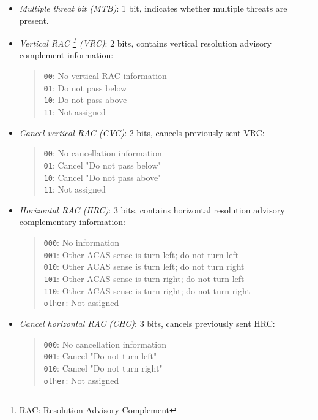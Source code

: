 \begin{itemize}
  \item \emph{Multiple threat bit (MTB)}: 1 bit, indicates whether multiple threats are present.

  \item \emph{Vertical RAC \footnote{RAC: Resolution Advisory Complement} (VRC)}: 2 bits, contains vertical resolution advisory complement information:
  \begin{quote}
    \small
    \texttt{00}: No vertical RAC information \\
    \texttt{01}: Do not pass below \\
    \texttt{10}: Do not pass above \\
    \texttt{11}: Not assigned
  \end{quote}

  \item \emph{Cancel vertical RAC (CVC)}: 2 bits, cancels previously sent VRC:
  \begin{quote}
    \small
    \texttt{00}: No cancellation information \\
    \texttt{01}: Cancel "Do not pass below" \\
    \texttt{10}: Cancel "Do not pass above" \\
    \texttt{11}: Not assigned
  \end{quote}

  \item \emph{Horizontal RAC (HRC)}: 3 bits, contains horizontal resolution advisory complementary information:
  \begin{quote}
    \small
    \texttt{000}: No information\\
    \texttt{001}: Other ACAS sense is turn left; do not turn left \\
    \texttt{010}: Other ACAS sense is turn left; do not turn right \\
    \texttt{101}: Other ACAS sense is turn right; do not turn left \\
    \texttt{110}: Other ACAS sense is turn right; do not turn right \\
    \texttt{other}: Not assigned
  \end{quote}

  \item \emph{Cancel horizontal RAC (CHC)}: 3 bits, cancels previously sent HRC:
  \begin{quote}
    \small
    \texttt{000}: No cancellation information \\
    \texttt{001}: Cancel "Do not turn left" \\
    \texttt{010}: Cancel "Do not turn right" \\
    \texttt{other}: Not assigned
  \end{quote}


\end{itemize}
